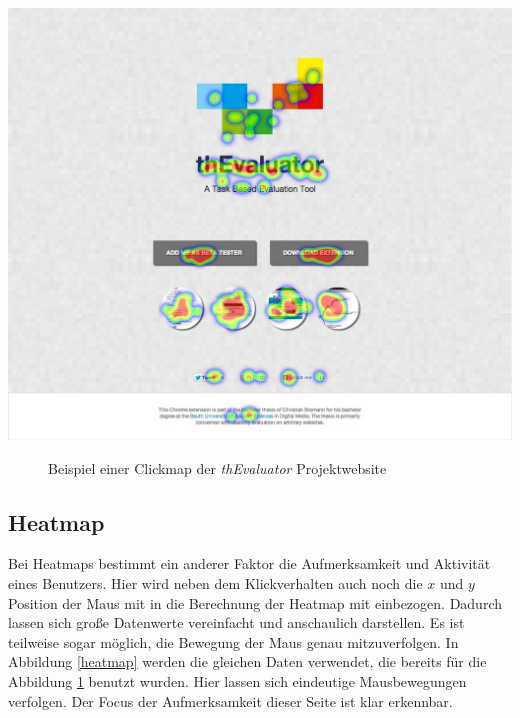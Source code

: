 \vspace{0.3cm}
\begin{center}
\includegraphics[scale=0.35]{./images/clickmap}
\end{center}
\begin{figure}[htb]
   \centering
   \caption{Beispiel einer Clickmap der \textit{thEvaluator} Projektwebsite}
    \label{clickmap}
\end{figure}


\subsection{Heatmap}

Bei Heatmaps bestimmt ein anderer Faktor die Aufmerksamkeit und Aktivität eines Benutzers. Hier wird neben dem Klickverhalten auch noch die $ x $ und $ y $ Position der Maus mit in die Berechnung der Heatmap mit einbezogen. Dadurch lassen sich große Datenwerte vereinfacht und anschaulich darstellen. Es ist teilweise sogar möglich, die Bewegung der Maus genau mitzuverfolgen. In Abbildung \ref{heatmap} werden die gleichen Daten verwendet, die bereits für die Abbildung \ref{clickmap} benutzt wurden. Hier lassen sich eindeutige Mausbewegungen verfolgen. Der Focus der Aufmerksamkeit dieser Seite ist klar erkennbar.

